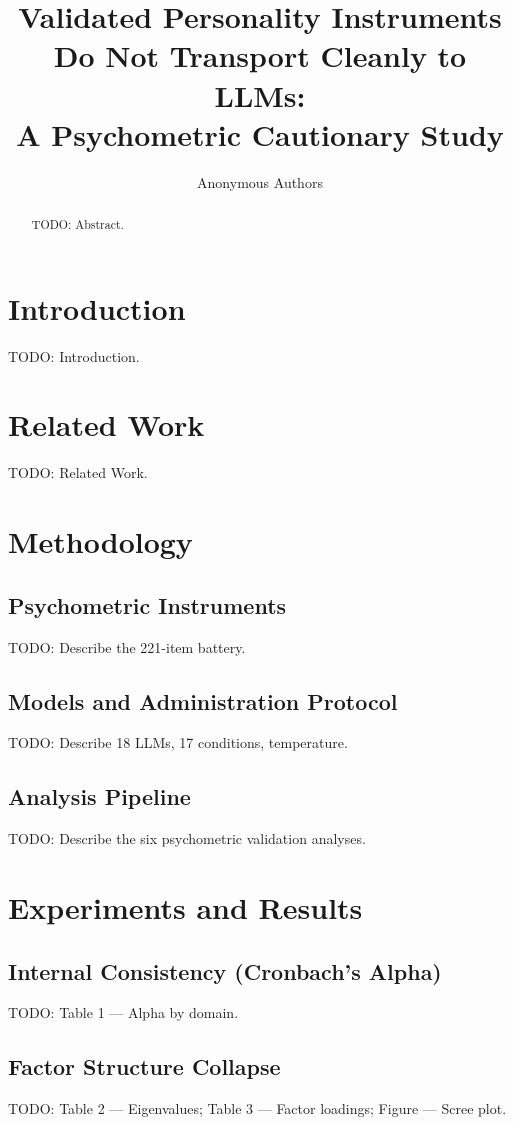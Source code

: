 \documentclass[11pt]{article}
\title{Validated Personality Instruments Do Not Transport Cleanly to LLMs:\\ A Psychometric Cautionary Study}
\author{Anonymous Authors}
\date{}
\begin{document}
\maketitle

\begin{abstract}
TODO: Abstract.
\end{abstract}

\section{Introduction}
TODO: Introduction.

\section{Related Work}
TODO: Related Work.

\section{Methodology}
\subsection{Psychometric Instruments}
TODO: Describe the 221-item battery.

\subsection{Models and Administration Protocol}
TODO: Describe 18 LLMs, 17 conditions, temperature.

\subsection{Analysis Pipeline}
TODO: Describe the six psychometric validation analyses.

\section{Experiments and Results}
\subsection{Internal Consistency (Cronbach's Alpha)}
TODO: Table 1 — Alpha by domain.

\subsection{Factor Structure Collapse}
TODO: Table 2 — Eigenvalues; Table 3 — Factor loadings; Figure — Scree plot.
\end{document}
